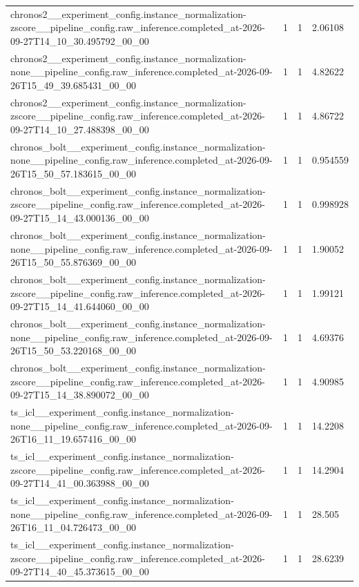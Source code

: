 \begin{tabular}{llll}
chronos2\_\_experiment\_config.instance\_normalization-zscore\_\_pipeline\_config.raw\_inference.completed\_at-2026-09-27T14\_10\_30.495792\_00\_00 & 1 & 1 & 2.06108 \\
chronos2\_\_experiment\_config.instance\_normalization-none\_\_pipeline\_config.raw\_inference.completed\_at-2026-09-26T15\_49\_39.685431\_00\_00 & 1 & 1 & 4.82622 \\
chronos2\_\_experiment\_config.instance\_normalization-zscore\_\_pipeline\_config.raw\_inference.completed\_at-2026-09-27T14\_10\_27.488398\_00\_00 & 1 & 1 & 4.86722 \\
chronos\_bolt\_\_experiment\_config.instance\_normalization-none\_\_pipeline\_config.raw\_inference.completed\_at-2026-09-26T15\_50\_57.183615\_00\_00 & 1 & 1 & 0.954559 \\
chronos\_bolt\_\_experiment\_config.instance\_normalization-zscore\_\_pipeline\_config.raw\_inference.completed\_at-2026-09-27T15\_14\_43.000136\_00\_00 & 1 & 1 & 0.998928 \\
chronos\_bolt\_\_experiment\_config.instance\_normalization-none\_\_pipeline\_config.raw\_inference.completed\_at-2026-09-26T15\_50\_55.876369\_00\_00 & 1 & 1 & 1.90052 \\
chronos\_bolt\_\_experiment\_config.instance\_normalization-zscore\_\_pipeline\_config.raw\_inference.completed\_at-2026-09-27T15\_14\_41.644060\_00\_00 & 1 & 1 & 1.99121 \\
chronos\_bolt\_\_experiment\_config.instance\_normalization-none\_\_pipeline\_config.raw\_inference.completed\_at-2026-09-26T15\_50\_53.220168\_00\_00 & 1 & 1 & 4.69376 \\
chronos\_bolt\_\_experiment\_config.instance\_normalization-zscore\_\_pipeline\_config.raw\_inference.completed\_at-2026-09-27T15\_14\_38.890072\_00\_00 & 1 & 1 & 4.90985 \\
ts\_icl\_\_experiment\_config.instance\_normalization-none\_\_pipeline\_config.raw\_inference.completed\_at-2026-09-26T16\_11\_19.657416\_00\_00 & 1 & 1 & 14.2208 \\
ts\_icl\_\_experiment\_config.instance\_normalization-zscore\_\_pipeline\_config.raw\_inference.completed\_at-2026-09-27T14\_41\_00.363988\_00\_00 & 1 & 1 & 14.2904 \\
ts\_icl\_\_experiment\_config.instance\_normalization-none\_\_pipeline\_config.raw\_inference.completed\_at-2026-09-26T16\_11\_04.726473\_00\_00 & 1 & 1 & 28.505 \\
ts\_icl\_\_experiment\_config.instance\_normalization-zscore\_\_pipeline\_config.raw\_inference.completed\_at-2026-09-27T14\_40\_45.373615\_00\_00 & 1 & 1 & 28.6239 \\

\end{tabular}
